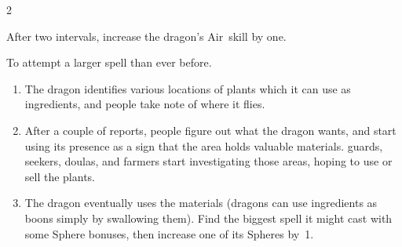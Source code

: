 \begin{multicols}{2}
\begin{dlist}
  After two \glspl{interval}, increase the dragon's Air~\gls{skill} by one.
  \item
  To attempt a larger spell than ever before.
  \begin{enumerate}
    \item
    The dragon identifies various locations of plants which it can use as \glspl{ingredient}, and people take note of where it flies.
    \item
    After a couple of reports, people figure out what the dragon wants, and start using its presence as a sign that the area holds valuable materials.
    \Glspl{guard}, \glspl{seeker}, \glspl{doula}, and farmers start investigating those areas, hoping to use or sell the plants.
    \item
    The dragon eventually uses the materials (dragons can use \glspl{ingredient} as \glspl{boon} simply by swallowing them).
    Find the biggest spell it might cast with some Sphere bonuses, then increase one of its Spheres by~1.
  \end{enumerate}
\end{dlist}

\end{multicols}

\section{}
\label{dryad}


